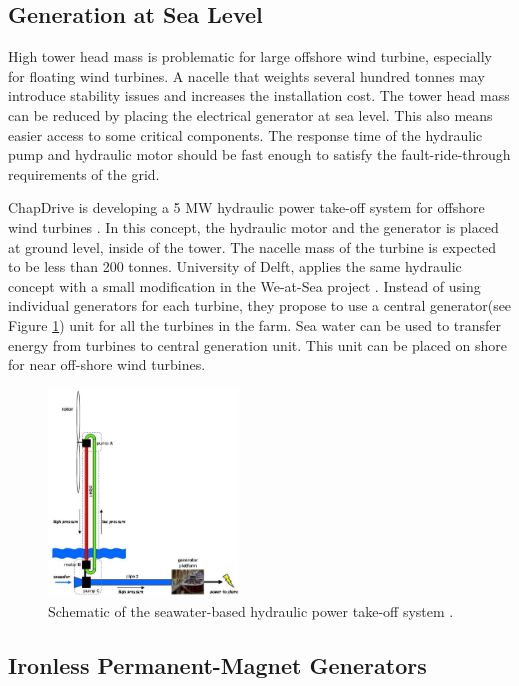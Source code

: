 \documentclass[a4paper, 11pt]{article} %
\begin{document}
\subsection{Generation at Sea Level}

High tower head mass is problematic for large offshore wind turbine, especially for floating wind turbines. A nacelle that weights several hundred tonnes may introduce stability issues and increases the installation cost. The tower head mass can be reduced by placing the electrical generator at sea level. This also means easier access to some critical components. The response time of the hydraulic pump and hydraulic motor should be fast enough to satisfy the fault-ride-through requirements of the grid.

ChapDrive is developing a 5 MW hydraulic power take-off system for offshore wind turbines \cite{Thomsen2011}. In this concept, the hydraulic motor and the generator is placed at ground level, inside of the tower. The nacelle mass of the turbine is expected to be less than 200 tonnes. University of Delft, applies the same hydraulic concept with a small modification in the We-at-Sea project \cite{Diepeveen2004}. Instead of using individual generators for each turbine, they propose to use a central generator(see Figure \ref{we-at-sea}) unit for all the turbines in the farm. Sea water can be used to transfer energy from turbines to central generation unit. This unit can be placed on shore for near off-shore wind turbines.

  \begin{figure}[]
    \centering
    \includegraphics[width=0.45\textwidth]{we-at-sea}
    \caption{Schematic of the seawater-based hydraulic power take-off system  \cite{Diepeveen2004}.} 
    \label{we-at-sea}
  \end{figure}

\subsection{Ironless Permanent-Magnet Generators}
\end{document}

